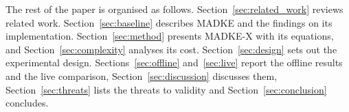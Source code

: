 The rest of the paper is organised as follows. Section~\ref{sec:related_work} reviews related work. Section~\ref{sec:baseline} describes MADKE and the findings on its implementation. Section~\ref{sec:method} presents MADKE-X with its equations, and Section~\ref{sec:complexity} analyses its cost. Section~\ref{sec:design} sets out the experimental design. Sections~\ref{sec:offline} and~\ref{sec:live} report the offline results and the live comparison, Section~\ref{sec:discussion} discusses them, Section~\ref{sec:threats} lists the threats to validity and Section~\ref{sec:conclusion} concludes.
